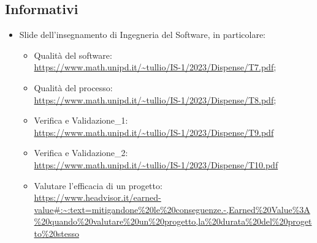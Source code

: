 \subsection{Informativi}
\begin{itemize}
    \item Slide dell’insegnamento di Ingegneria del Software, in particolare:
        \begin{itemize}
            \item Qualità del software: \\ \url{https://www.math.unipd.it/~tullio/IS-1/2023/Dispense/T7.pdf};
            \item Qualità del processo:\\ \url{https://www.math.unipd.it/~tullio/IS-1/2023/Dispense/T8.pdf};
            \item Verifica e Validazione\_1:\\ \url{https://www.math.unipd.it/~tullio/IS-1/2023/Dispense/T9.pdf}
            \item Verifica e Validazione\_2:\\ \url{https://www.math.unipd.it/~tullio/IS-1/2023/Dispense/T10.pdf}
            \item Valutare l'efficacia di un progetto: \\ \url{https://www.headvisor.it/earned-value#:~:text=mitigandone%20le%20conseguenze.-,Earned%20Value%3A%20quando%20valutare%20un%20progetto,la%20durata%20del%20progetto%20stesso}
        \end{itemize}
\end{itemize}
